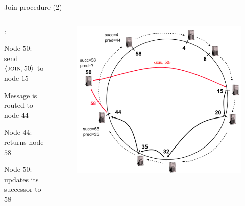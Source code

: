 \begin{frame}{Join procedure (2)}

\begin{columns}
\begin{column}{0.4\textwidth}
:
\BI
\item Node $50$: send $\langle \textsc{join}, 50 \rangle$ to node $15$ 
\item Message is routed to node $44$
\item Node $44$: returns node $58$ 
\item Node $50$: updates its successor to $58$
\EI

\end{column}
\begin{column}{0.6\textwidth}
\begin{figure}
\includegraphics[width=1.0\textwidth]{chord-example4}
\end{figure}
\end{column}
\end{columns}

\end{frame}

